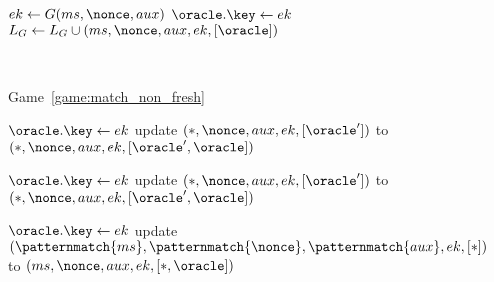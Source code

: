 \begin{figure}
\begin{leftfullpage}
\begin{adjustbox}{tabular={cc},Trim=0.9ex 0 0 0, width=\textwidth}
\begin{adjustbox}{minipage=[t][]{\codewidth},fbox}
\begin{algorithmic}[1]
			\color{black}
			
			\Else 
				\State {}
				\State $ek \gets G(ms, \nonce, aux)$
				\State $\oracle.\key \gets ek$
				\State $L_G \gets L_G \cup  (ms, \nonce, aux, ek, [\oracle]) $
			\EndIf
			

			
		\end{algorithmic}
	\end{adjustbox}
	

	\\

	\begin{adjustbox}{minipage=[t][]{\codewidth},fbox}
		\begin{algorithmic}[1]
		
			\State {}
			\Comment Game~\ref{game:match_non_fresh}
			
				\State $\oracle.\key \gets ek$
				\State update $(*, \nonce, aux, ek, [\oracle'])$ to $(*, \nonce, aux, ek, [\oracle', \oracle])$
		
			\color{black}
		
			\State \hspace*{-\algorithmicindent} 
				\State $\oracle.\key \gets ek$
				\State update $(*, \nonce, aux, ek, [\oracle'])$ to $(*, \nonce, aux, ek, [\oracle', \oracle])$
			
			\color{black}
		
			\State \hspace*{-\algorithmicindent} 
				\State $\oracle.\key \gets ek$
				\State update $(\patternmatch{ms},\patternmatch{\nonce}, \patternmatch{aux}, ek, [*])$ to $(ms, \nonce, aux, ek, [*,\oracle])$
			

\end{algorithmic}
\end{adjustbox}
\end{adjustbox}
\end{leftfullpage}
\end{figure}
